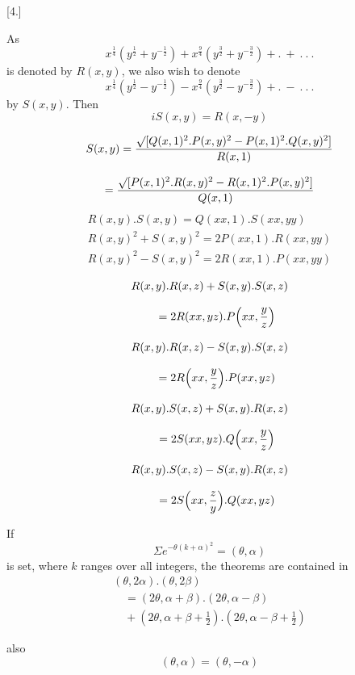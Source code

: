 \par\medskip{}\centerline{[4.]}\nobreak\smallskip
As
\[
x^{\frac14}(y^{\frac12}+y^{-\frac12})+x^{\frac94}(y^{\frac32}+y^{-\frac32})+.\ +\ .\ .\ .
\]
is denoted by $R(x,y)$, we also wish to denote
\[
x^{\frac14}(y^{\frac12}-y^{-\frac12})-x^{\frac94}(y^{\frac32}-y^{-\frac32})+.\ -\ .\ .\ .
\]
by $S(x,y)$. Then
\[
iS(x,y)=R(x,-y)
\]

\[
\begin{gathered}
S(x,y)=\frac{\surd[Q(x,1)^2.P(x,y)^2-P(x,1)^2.Q(x,y)^2]}{R(x,1)}\\[8pt]
=\frac{\surd[P(x,1)^2.R(x,y)^2-R(x,1)^2.P(x,y)^2]}{Q(x,1)}
\end{gathered}
\]
\[
\begin{gathered}
R(x,y).S(x,y)=Q(xx,1).S(xx,yy)\\[8pt]
R(x,y)^2+S(x,y)^2=2P(xx,1).R(xx,yy)\\[8pt]
R(x,y)^2-S(x,y)^2=2R(xx,1).P(xx,yy)
\end{gathered}
\]

\[
\begin{gathered}
R(x,y).R(x,z)+S(x,y).S(x,z)\\[8pt]\quad{}=2R(xx,yz).P\Bigl(xx,\frac yz\Bigr)\\[8pt]
R(x,y).R(x,z)-S(x,y).S(x,z)\\[8pt]\quad{}=2R\Bigl(xx,\frac yz\Bigr).P(xx,yz)\\[8pt]
R(x,y).S(x,z)+S(x,y).R(x,z)\\[8pt]\quad{}=2S(xx,yz).Q\Bigl(xx,\frac yz\Bigr)\\[8pt]
R(x,y).S(x,z)-S(x,y).R(x,z)\\[8pt]\quad{}=2S\Bigl(xx,\frac zy\Bigr).Q(xx,yz)
\end{gathered}
\]

If
\[
\Sigma e^{-\theta(k+\alpha)^2}=(\theta,\alpha)
\]
is set, where $k$ ranges over all integers, the theorems are contained in
\[
\begin{gathered}(\theta,2\alpha).(\theta,2\beta)
\\[8pt]\quad{}=(2\theta,\alpha+\beta).(2\theta,\alpha-\beta)
\\[8pt]\quad{}+(2\theta,\alpha+\beta+\tfrac12).(2\theta,\alpha-\beta+\tfrac12)\end{gathered}
\]



\providecommand{\GaussCircleArrow}{\ensuremath{\mathord{\vcenter{\hbox{\setlength{\unitlength}{1pt}\begin{picture}(10,11)\linethickness{.55pt}\put(3.3,3.3){\circle{5.2}}\put(5.1,5.1){\line(1,1){3.2}}\put(5.6,8.3){\line(1,0){2.7}}\put(8.3,5.6){\line(0,1){2.7}}\end{picture}}}}}}

also
\[
(\theta,\alpha)=(\theta,-\alpha)
\]
\clearpage
\endgroup

